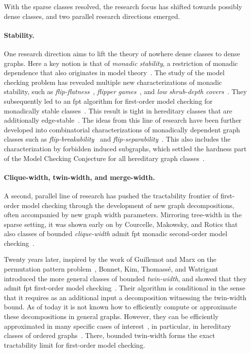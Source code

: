 \medskip
With the sparse classes resolved, the research focus has shifted towards possibly dense classes,
and two parallel research directions emerged.

\paragraph*{Stability.}
One research direction aims to lift the theory of nowhere dense classes to dense graphs.
Here a key notion is that of \emph{monadic stability}, a restriction of monadic dependence that also originates in model theory~\cite{BS1985monadic}.
The study of the model checking problem has revealed multiple new characterizations of monadic stability, such as \emph{flip-flatness}~\cite{dreier2023indiscernibles}, \emph{flipper games}~\cite{flippers}, and \emph{low shrub-depth covers}~\cite{horizons}.
They subsequently led to an fpt algorithm for first-order model checking for monadically stable classes~\cite{ms-mc1,ms-mc2}.
This result is tight in hereditary classes that are additionally edge-stable~\cite{ms-mc2,rankwidth-meets-stability}.
The ideas from this line of research have been further developed into combinatorial characterizations of monadically dependent graph classes such as \emph{flip-breakability}~\cite{flip-breakability} and \emph{flip-separability}~\cite{bonnet2025separability-icalp}.
This also includes the characterization by forbidden induced subgraphs, which settled the hardness part of the Model Checking Conjecture for all hereditary graph classes~\cite{flip-breakability}.

\paragraph*{Clique-width, twin-width, and merge-width.}
A second, parallel line of research has pushed the tractability frontier of first-order model checking through the development of new graph decompositions, often accompanied by new graph width parameters.
Mirroring tree-width in the sparse setting, it was shown early on by Courcelle, Makowsky, and Rotics that also classes of bounded \emph{clique-width} admit fpt monadic second-order model checking~\cite{courcelle2000linear}.

Twenty years later, inspired by the work of Guillemot and Marx on the permutation pattern problem~\cite{guillemot2014finding}, Bonnet, Kim, Thomass\'e, and Watrigant introduced the more general classes of bounded \emph{twin-width}, and showed that they admit fpt first-order model checking~\cite{tww1}.
Their algorithm is conditional in the sense that it requires as an additional input a decomposition witnessing the twin-width bound.
As of today it is not known how to efficiently compute or approximate these decompositions in general graphs. However, they can be efficiently approximated in many specific cases of interest~\cite{tww8}, in particular, in hereditary classes of ordered graphs~\cite{tww4}.
There, bounded twin-width forms the exact tractability limit for first-order model checking.

